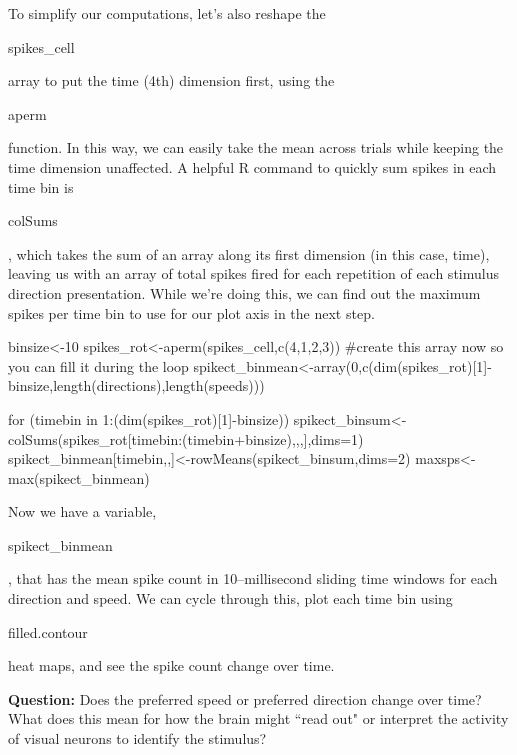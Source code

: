 \documentclass[
letterpaper, %
11pt, %
 oneside, 
onecolumn, %
]{memoir}
\numberwithin{Exercise}{chapter}
\begin{document}
To simplify our computations, let's also reshape the \begin{ttfamily}spikes\_cell\end{ttfamily}  array 
to put the time (4th) dimension first, using the \begin{ttfamily}aperm\end{ttfamily} function. 
In this way, we can easily take the mean across trials while keeping the time dimension unaffected. 
A helpful R command to quickly sum spikes in each time bin is \begin{ttfamily}colSums\end{ttfamily}, 
which takes the sum of an array along its first dimension (in this case, time), 
leaving us with an array of total spikes fired for each repetition of each stimulus direction presentation. 
While we're doing this, we can find out the maximum spikes per time bin to use for our plot axis in the next step.


\begin{shortrcode}
binsize<-10
spikes_rot<-aperm(spikes_cell,c(4,1,2,3))
#create this array now so you can fill it during the loop
spikect_binmean<-array(0,c(dim(spikes_rot)[1]-binsize,length(directions),length(speeds)))

for (timebin in 1:(dim(spikes_rot)[1]-binsize)){
  spikect_binsum<-colSums(spikes_rot[timebin:(timebin+binsize),,,],dims=1)
  spikect_binmean[timebin,,]<-rowMeans(spikect_binsum,dims=2)
}
maxsps<-max(spikect_binmean)

\end{shortrcode}

Now we have a variable, \begin{ttfamily}spikect\_binmean\end{ttfamily}, that has the mean spike count in 10--millisecond sliding time windows for each direction and speed. We can cycle through this, plot each time bin using 
\begin{ttfamily}filled.contour\end{ttfamily} heat maps, and see the spike count change over time.  

\textbf{Question:} Does the preferred speed or preferred direction change over time?  
What does this mean for how the brain might ``read out" or interpret the activity of visual neurons to identify the stimulus?
\end{document}
